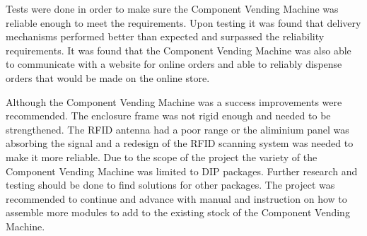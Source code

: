 \documentclass[a4paper,11pt]{article}
\numberwithin{figure}{section}
\numberwithin{table}{section}
\begin{document}
Tests were done in order to make sure the Component Vending Machine was reliable enough to meet the requirements. Upon testing it was found that delivery mechanisms performed better than expected and surpassed the reliability requirements. It was found that the Component Vending Machine was also able to communicate with a website for online orders and able to reliably dispense orders that would be made on the online store.

Although the Component Vending Machine was a success improvements were recommended. The enclosure frame was not rigid enough and needed to be strengthened. The RFID antenna had a poor range or the aliminium panel was absorbing the signal and a redesign of the RFID scanning system was needed to make it more reliable. Due to the scope of the project the variety of the Component Vending Machine was limited to DIP packages. Further research and testing should be done to find solutions for other packages. The project was recommended to continue and advance with manual and instruction on how to assemble more modules to add to the existing stock of the Component Vending Machine.
	
	\newpage	
	\tableofcontents
	\newpage
	\listoffigures
	\newpage
	\listoftables
	\newpage
	
	\mbox{}
	\printnomenclature[2cm]	
	
\end{document}
